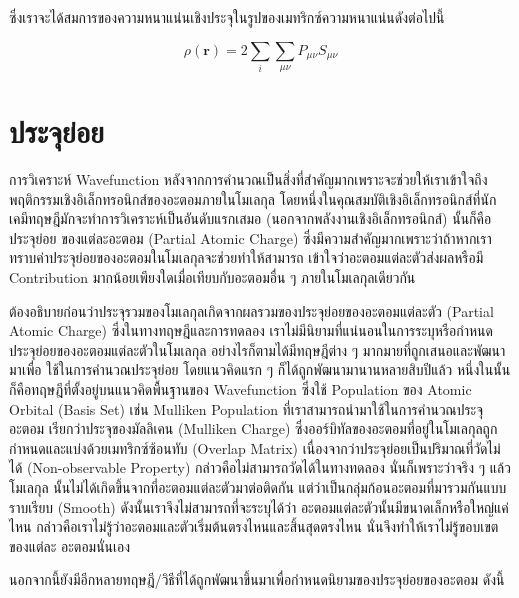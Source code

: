 \noindent ซึ่งเราจะได้สมการของความหนาแน่นเชิงประจุในรูปของเมทริกซ์ความหนาแน่นดังต่อไปนี้

\begin{equation}\label{eq:charge_density_matrix}
    \rho(\bm{r}) = 2 \sum_{i} \sum_{\mu\nu} P_{\mu\nu}S_{\mu\nu}
\end{equation}

\section{ประจุย่อย}
\label{sec:partial_charge}

การวิเคราะห์ Wavefunction หลังจากการคำนวณเป็นสิ่งที่สำคัญมากเพราะจะช่วยให้เราเข้าใจถึงพฤติกรรมเชิงอิเล็กทรอนิกส์ของอะตอมภายในโมเลกุล
โดยหนึ่งในคุณสมบัติเชิงอิเล็กทรอนิกส์ที่นักเคมีทฤษฎีมักจะทำการวิเคราะห์เป็นอันดับแรกเสมอ (นอกจากพลังงานเชิงอิเล็กทรอนิกส์) นั้นก็คือประจุย่อย%
ของแต่ละอะตอม (Partial Atomic Charge) ซึ่งมีความสำคัญมากเพราะว่าถ้าหากเราทราบค่าประจุย่อยของอะตอมในโมเลกุลจะช่วยทำให้สามารถ%
เข้าใจว่าอะตอมแต่ละตัวส่งผลหรือมี Contribution มากน้อยเพียงใดเมื่อเทียบกับอะตอมอื่น ๆ ภายในโมเลกุลเดียวกัน

ต้องอธิบายก่อนว่าประจุรวมของโมเลกุลเกิดจากผลรวมของประจุย่อยของอะตอมแต่ละตัว (Partial Atomic Charge) ซึ่งในทางทฤษฎีและการทดลอง%
เราไม่มีนิยามที่แน่นอนในการระบุหรือกำหนดประจุย่อยของอะตอมแต่ละตัวในโมเลกุล อย่างไรก็ตามได้มีทฤษฎีต่าง ๆ มากมายที่ถูกเสนอและพัฒนามาเพื่อ%
ใช้ในการคำนวณประจุย่อย โดยแนวคิดแรก ๆ ก็ได้ถูกพัฒนามานานหลายสิบปีแล้ว หนึ่งในนั้นก็คือทฤษฎีที่ตั้งอยู่บนแนวคิดพื้นฐานของ Wavefunction
ซึ่งใช้ Population ของ Atomic Orbital (Basis Set) เช่น Mulliken Population ที่เราสามารถนำมาใช้ในการคำนวณประจุอะตอม
เรียกว่าประจุของมัลลิเคน (Mulliken Charge) ซึ่งออร์บิทัลของอะตอมที่อยู่ในโมเลกุลถูกกำหนดและแบ่งด้วยเมทริกซ์ซ้อนทับ (Overlap Matrix)
เนื่องจากว่าประจุย่อยเป็นปริมาณที่วัดไม่ได้ (Non-observable Property) กล่าวคือไม่สามารถวัดได้ในทางทดลอง นั่นก็เพราะว่าจริง ๆ แล้วโมเลกุล%
นั้นไม่ได้เกิดขึ้นจากที่อะตอมแต่ละตัวมาต่อติดกัน แต่ว่าเป็นกลุ่มก้อนอะตอมที่มารวมกันแบบราบเรียบ (Smooth) ดังนั้นเราจึงไม่สามารถที่จะระบุได้ว่า%
อะตอมแต่ละตัวนั้นมีขนาดเล็กหรือใหญ่แค่ไหน กล่าวคือเราไม่รู้ว่าอะตอมและตัวเริ่มต้นตรงไหนและสิ้นสุดตรงไหน นั่นจึงทำให้เราไม่รู้ขอบเขตของแต่ละ%
อะตอมนั่นเอง

นอกจากนี้ยังมีอีกหลายทฤษฎี/วิธีที่ได้ถูกพัฒนาขึ้นมาเพื่อกำหนดนิยามของประจุย่อยของอะตอม ดังนี้

